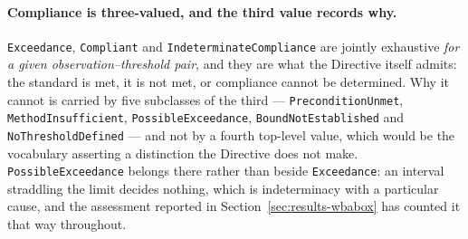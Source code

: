 \paragraph{Compliance is three-valued, and the third value records why.}
\texttt{Exceedance}, \texttt{Compliant} and \texttt{IndeterminateCompliance} are
jointly exhaustive \emph{for a given observation--threshold pair}, and they are
what the Directive itself admits: the standard is met, it is not met, or
compliance cannot be determined. Why it cannot is carried by five subclasses of
the third --- \texttt{PreconditionUnmet}, \texttt{MethodInsufficient},
\texttt{PossibleExceedance}, \texttt{BoundNotEstablished} and
\texttt{NoThresholdDefined} --- and not by a
fourth top-level value, which would be the vocabulary asserting a distinction
the Directive does not make. \texttt{PossibleExceedance} belongs there rather
than beside \texttt{Exceedance}: an interval straddling the limit decides
nothing, which is indeterminacy with a particular cause, and the assessment
reported in Section~\ref{sec:results-wbabox} has counted it that way throughout.

